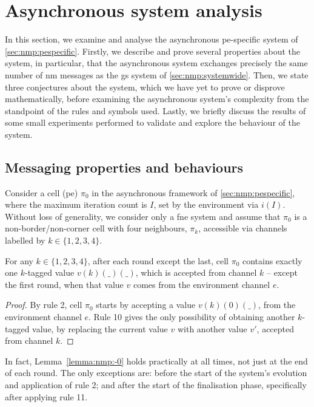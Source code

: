 \section{\label{sec:nmp:analysis}Asynchronous system analysis}

In this section, we examine and analyse the asynchronous \gls{pe}-specific system of \autoref{sec:nmp:pespecific}.  Firstly, we describe and prove several properties about the system, in particular, that the asynchronous system exchanges precisely the same number of \gls{nm} messages as the \gls{gs} system of \autoref{sec:nmp:systemwide}.  Then, we state three conjectures about the system, which we have yet to prove or disprove mathematically, before examining the asynchronous system's complexity from the standpoint of the rules and symbols used.  Lastly, we briefly discuss the results of some small experiments performed to validate and explore the behaviour of the system.

\subsection{\label{sec:nmp:msgprops}Messaging properties and behaviours}

Consider a cell (\gls{pe}) $\pi_0$ in the asynchronous framework of \autoref{sec:nmp:pespecific},
where the maximum iteration count is $I$, set by the environment via $i(I)$.
Without loss of generality, 
we consider only a \gls{fne} system and
assume that $\pi_0$ is a non-border/non-corner cell with four neighbours, 
$\pi_k$, accessible via channels labelled by $k \in \{ 1, 2, 3, 4 \}$. 

\begin{lemma}\label{lemma:nmp:-0}
    For any $k \in \{ 1, 2, 3, 4 \}$, after each round except the last,
    cell $\pi_0$ contains exactly one $k$-tagged value $v(k)(\_)(\_)$, 
    which is accepted from channel $k$ 
    -- except the first round, when that value $v$ comes from the environment channel $e$.
\end{lemma}

\begin{proof}
    By rule 2, cell $\pi_0$ starts by accepting a value $v(k)(0)(\_)$, from the environment channel $e$.
    Rule 10 gives the only possibility of obtaining another $k$-tagged value, by replacing the current value $v$ with another value $v'$, accepted from channel $k$. %
\end{proof}

\begin{remark}
    In fact, Lemma~\ref{lemma:nmp:-0} holds practically at all times, not just at the end of each round.  The only exceptions are: before the start of the system's evolution and application of rule 2; and after the start of the finalisation phase, specifically after applying rule 11.
\end{remark}

